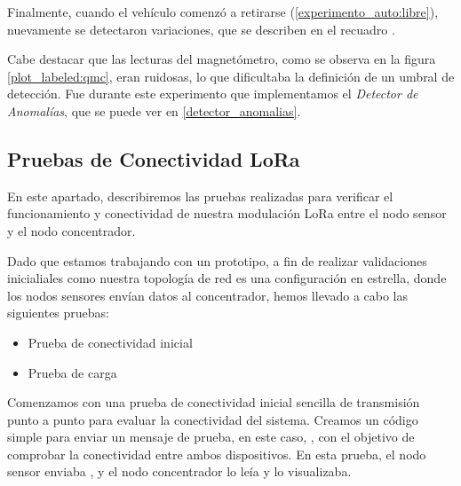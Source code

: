 Finalmente, cuando el vehículo comenzó a retirarse (\ref{experimento_auto:libre}), nuevamente se detectaron variaciones, que se describen en el recuadro .

Cabe destacar que las lecturas del magnetómetro, como se observa en la figura \ref{plot_labeled:qmc}, eran ruidosas, lo que dificultaba la definición de un umbral de detección. Fue durante este experimento que implementamos el \textit{Detector de Anomalías}, que se puede ver en \ref{detector_anomalias}.


\subsection{Pruebas de Conectividad LoRa}\label{title:cx_load_concentrador}

En este apartado, describiremos las pruebas realizadas para verificar el funcionamiento y conectividad de nuestra modulación LoRa entre el nodo sensor y el nodo concentrador.

Dado que estamos trabajando con un prototipo, a fin de realizar validaciones inicialiales como nuestra topología de red es una configuración en estrella, donde los nodos sensores envían datos al concentrador, hemos llevado a cabo las siguientes pruebas:

\begin{itemize}
    \item Prueba de conectividad inicial
    \item Prueba de carga
\end{itemize}

Comenzamos con una prueba de conectividad inicial sencilla de transmisión punto a punto para evaluar la conectividad del sistema. Creamos un código simple para enviar un mensaje de prueba, en este caso, , con el objetivo de comprobar la conectividad entre ambos dispositivos. En esta prueba, el nodo sensor enviaba , y el nodo concentrador lo leía y lo visualizaba.

